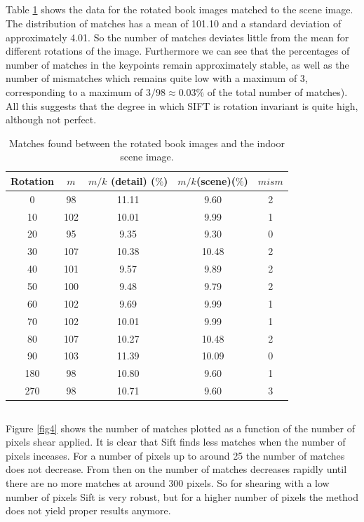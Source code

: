 \documentclass{article}
\begin{document}
\subsection{}
Table \ref{table4} shows the data for the rotated book images matched to the scene image. The distribution of matches has a mean of 101.10 and a standard deviation of approximately 4.01. So the number of matches deviates little from the mean for different rotations of the image. Furthermore we can see that the percentages of number of matches in the keypoints remain approximately stable, as well as the number of mismatches which remains quite low with a maximum of 3, corresponding to a maximum of $3/98 \approx 0.03 \% $ of the total number of matches). All this suggests that the degree in which SIFT is rotation invariant is quite high, although not perfect.

\begin{table}[H]
\centering
 \caption{Matches found between the rotated book images and the indoor scene image.}
 \label{table4}
 \begin{tabular}{|c|c|c|c|c|}
 \hline
  Rotation & $m$ & $m/k$ (detail) ($\%$) & $m/k$(scene)($\%$) & $mism$\\
  \hline
  0 & 98 & 11.11 & 9.60 & 2 \\
  10 & 102 & 10.01 & 9.99 & 1 \\
  20 & 95 & 9.35 & 9.30 & 0 \\
  30 & 107 & 10.38 & 10.48 & 2 \\
  40 & 101 & 9.57 & 9.89 & 2 \\
  50 & 100 & 9.48 & 9.79 & 2 \\
  60 & 102 & 9.69 & 9.99 & 1 \\
  70 & 102 & 10.01 & 9.99 & 1 \\
  80 & 107 & 10.27 & 10.48 & 2 \\
  90 & 103 & 11.39 & 10.09 & 0 \\
  180 & 98 & 10.80 & 9.60 & 1 \\
  270 & 98 & 10.71 & 9.60 & 3 \\
  \hline
 \end{tabular}
\end{table}

\subsection{}
Figure \ref{fig4} shows the number of matches plotted as a function of the number of pixels shear applied. It is clear that Sift finds less matches when the number of pixels inceases. For a number of pixels up to around 25 the number of matches does not decrease. From then on the number of matches decreases rapidly until there are no more matches at around 300 pixels. So for shearing with a low number of pixels Sift is very robust, but for a higher number of pixels the method does not yield proper results anymore.
\end{document}
